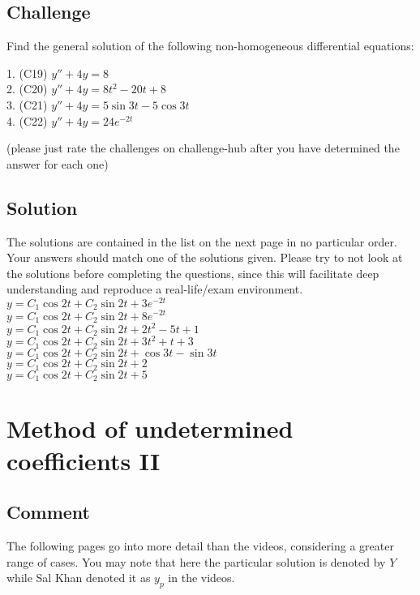 \subsection*{Challenge}
Find the general solution of the following non-homogeneous differential equations:

1. (C19) $y'' + 4y = 8$\\
2. (C20) $y'' + 4y = 8t^2 - 20t + 8$\\
3. (C21) $y'' + 4y = 5 \sin 3t - 5 \cos 3t$\\
4. (C22) $y'' + 4y = 24 e^{-2t}$

(please just rate the challenges on challenge-hub after you have determined the answer for each one)

\subsection*{Solution}
The solutions are contained in the list on the next page in no particular order. Your answers should match one of the solutions given. Please try to not look at the solutions before completing the questions, since this will facilitate deep understanding and reproduce a real-life/exam environment.
\newpage
$y = C_1 \cos 2t + C_2 \sin 2t + 3e^{-2t}$\\ %
$y = C_1 \cos 2t + C_2 \sin 2t + 8e^{-2t}$\\
$y = C_1 \cos 2t + C_2 \sin 2t + 2t^2 - 5t + 1$\\ %
$y = C_1 \cos 2t + C_2 \sin 2t + 3t^2 + t + 3$\\
$y = C_1 \cos 2t + C_2 \sin 2t + \cos 3t - \sin 3t$\\ %
$y = C_1 \cos 2t + C_2 \sin 2t + 2$\\ %
$y = C_1 \cos 2t + C_2 \sin 2t + 5$\\



\iffalse
\newpage
\section{Method of undetermined coefficients II}

\subsection*{Comment}
The following pages go into more detail than the videos, considering a greater range of cases. You may note that here the particular solution is denoted by $Y$ while Sal Khan denoted it as $y_p$ in the videos.

